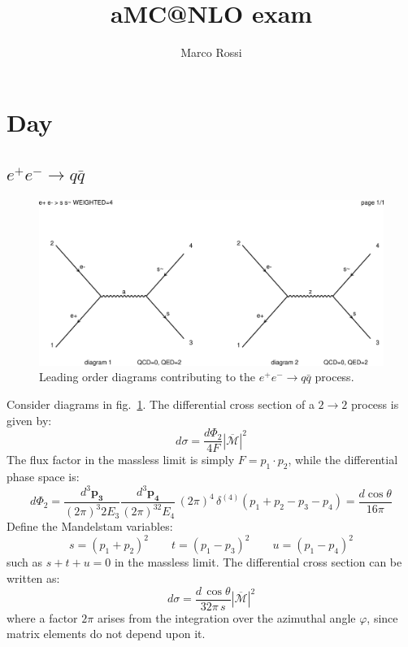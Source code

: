 \documentclass[]{article}
\title{aMC@NLO exam}
\author{Marco Rossi}
\begin{document}
\maketitle

\section{Day}

\subsection{$e^+ e^- \rightarrow q \bar{q}$}
\begin{figure}[b!]
	\includegraphics[width=\textwidth]{plots/diagrams.png}
	\caption{Leading order diagrams contributing to the $e^+ e^- \rightarrow q
	\bar{q}$ process.}
	\label{diagrams}
\end{figure}

Consider diagrams in fig.~\ref{diagrams}. The differential cross section of a
$2\rightarrow 2$ process is given by:
\begin{equation}
\label{xsec}
d\sigma = \frac{d\Phi_2}{4F} |\overline{\mathcal{M}}|^2
\end{equation}
The flux factor in the massless limit is simply $F=p_1\cdot p_2$, while the
differential phase space is:
\begin{equation}
	d\Phi_2=\frac{d^3\mathbf{p_3}}{(2\pi)^3 2E_3}\frac{d^3\mathbf{p_4}}{(2\pi)^32E_4}\,
	(2 \pi)^4\,\delta^{(4)}(p_1+p_2-p_3-p_4) = \frac{d \cos\theta}{16 \pi}
\end{equation}
Define the Mandelstam variables:
\begin{equation}
s = (p_1+p_2)^2 \qquad t = (p_1-p_3)^2 \qquad u = (p_1-p_4)^2
\end{equation}
such as $s+t+u=0$ in the massless limit.
The differential cross section can be written as:
\begin{equation}
\label{diff-xsec}
d\sigma = \frac{d\,\cos\theta}{32\pi \,s} |\overline{\mathcal{M}}|^2
\end{equation}
where a factor $2\pi$ arises from the integration over the azimuthal angle
$\varphi$, since matrix elements do not depend upon it.
\end{document}
